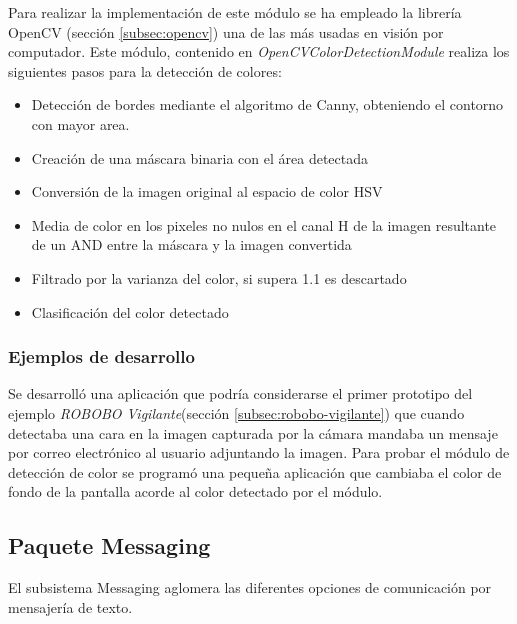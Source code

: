 Para realizar la implementación de este módulo se ha empleado la librería OpenCV\cite{itseez2015opencv} (sección \ref{subsec:opencv}) una de las más usadas en visión por computador. Este módulo, contenido en \textit{OpenCVColorDetectionModule} realiza los siguientes pasos para la detección de colores:
\begin{itemize}
	\item Detección de bordes mediante el algoritmo de Canny, obteniendo el contorno con mayor area.
	\item Creación de una máscara binaria con el área detectada
	\item Conversión de la imagen original al espacio de color HSV
	\item Media de color en los pixeles no nulos en el canal H de la imagen resultante de un AND entre la máscara y la imagen convertida
	\item Filtrado por la varianza del color, si supera 1.1 es descartado
	\item Clasificación del color detectado
\end{itemize}

\subsubsection*{Ejemplos de desarrollo}

Se desarrolló una aplicación que podría considerarse el primer prototipo del ejemplo \textit{ROBOBO Vigilante}(sección \ref{subsec:robobo-vigilante}) que cuando detectaba una cara en la imagen capturada por la cámara mandaba un mensaje por correo electrónico al usuario adjuntando la imagen.
Para probar el módulo de detección de color se programó una pequeña aplicación que cambiaba el color de fondo de la pantalla acorde al color detectado por el módulo.

\subsection{Paquete Messaging}
El subsistema Messaging aglomera las diferentes opciones de comunicación por mensajería de texto.


